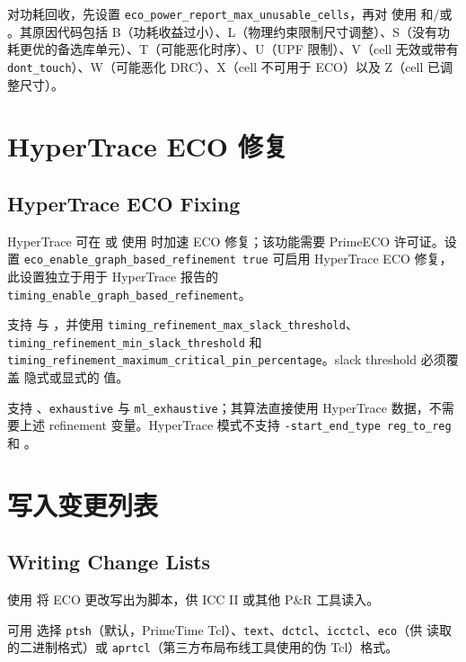 对功耗回收，先设置 \texttt{eco\_power\_report\_max\_unusable\_cells}，再对  使用  和/或 。其原因代码包括 B（功耗收益过小）、L（物理约束限制尺寸调整）、S（没有功耗更优的备选库单元）、T（可能恶化时序）、U（UPF 限制）、V（cell 无效或带有 \texttt{dont\_touch}）、W（可能恶化 DRC）、X（cell 不可用于 ECO）以及 Z（cell 已调整尺寸）。

\section{HyperTrace ECO 修复}
\subsection*{HyperTrace ECO Fixing}

HyperTrace 可在  或  使用  时加速 ECO 修复；该功能需要 PrimeECO 许可证。设置 \texttt{eco\_enable\_graph\_based\_refinement true} 可启用 HyperTrace ECO 修复，此设置独立于用于 HyperTrace 报告的 \texttt{timing\_enable\_graph\_based\_refinement}。

 支持  与 ，并使用 \texttt{timing\_refinement\_max\_slack\_threshold}、\texttt{timing\_refinement\_min\_slack\_threshold} 和 \texttt{timing\_refinement\_maximum\_critical\_pin\_percentage}。slack threshold 必须覆盖  隐式或显式的  值。

 支持 、\texttt{exhaustive} 与 \texttt{ml\_exhaustive}；其算法直接使用 HyperTrace 数据，不需要上述 refinement 变量。HyperTrace 模式不支持 \texttt{-start\_end\_type reg\_to\_reg} 和 。

\section{写入变更列表}
\subsection*{Writing Change Lists}

使用  将 ECO 更改写出为脚本，供 ICC II 或其他 P\&R 工具读入。

可用  选择 \texttt{ptsh}（默认，PrimeTime Tcl）、\texttt{text}、\texttt{dctcl}、\texttt{icctcl}、\texttt{eco}（供  读取的二进制格式）或 \texttt{aprtcl}（第三方布局布线工具使用的伪 Tcl）格式。

